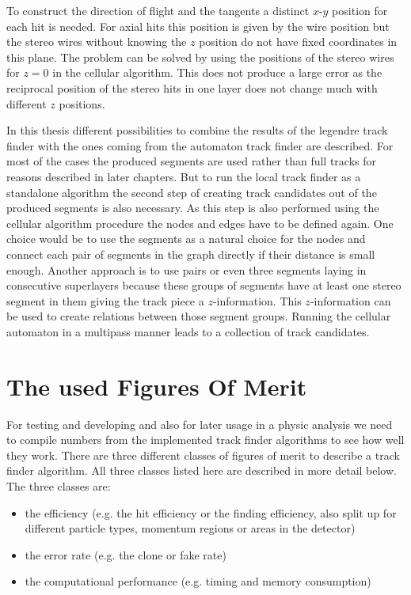 To construct the direction of flight and the tangents a distinct $x$-$y$ position for each hit is needed. For axial hits this position is given by the wire position but the stereo wires without knowing the $z$ position do not have fixed coordinates in this plane. The problem can be solved by using the positions of the stereo wires for $z = 0$ in the cellular algorithm. This does not produce a large error as the reciprocal position of the stereo hits in one layer does not change much with different $z$ positions.

In this thesis different possibilities to combine the results of the legendre track finder with the ones coming from the automaton track finder are described. For most of the cases the produced segments are used rather than full tracks for reasons described in later chapters. But to run the local track finder as a standalone algorithm the second step of creating track candidates out of the produced segments is also necessary. As this step is also performed using the cellular algorithm procedure the nodes and edges have to be defined again. One choice would be to use the segments as a natural choice for the nodes and connect each pair of segments in the graph directly if their distance is small enough. Another approach is to use pairs or even three segments laying in consecutive superlayers because these groups of segments have at least one stereo segment in them giving the track piece a $z$-information. This $z$-information can be used to create relations between those segment groups. Running the cellular automaton in a multipass manner leads to a collection of track candidates.


\section{The used Figures Of Merit}

For testing and developing and also for later usage in a physic analysis we need to compile numbers from the implemented track finder algorithms to see how well they work. There are three different classes of figures of merit to describe a track finder algorithm. All three classes listed here are described in more detail below. The three classes are:
\begin{itemize}
  \item the efficiency (e.g. the hit efficiency or the finding efficiency, also split up for different particle types, momentum regions or areas in the detector)
  \item the error rate (e.g. the clone or fake rate)
  \item the computational performance (e.g. timing and memory consumption)
\end{itemize}

